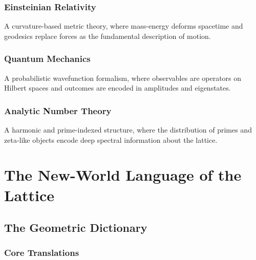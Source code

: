 \documentclass[12pt,oneside]{book}
\begin{document}
\section{Einsteinian Relativity}
A curvature-based metric theory, where mass-energy deforms spacetime and
geodesics replace forces as the fundamental description of motion.

\section{Quantum Mechanics}
A probabilistic wavefunction formalism, where observables are operators on
Hilbert spaces and outcomes are encoded in amplitudes and eigenstates.

\section{Analytic Number Theory}
A harmonic and prime-indexed structure, where the distribution of primes and
zeta-like objects encode deep spectral information about the lattice.

\newpage

\part{The New-World Language of the Lattice}

\chapter{The Geometric Dictionary}


\section{Core Translations}
\end{document}
